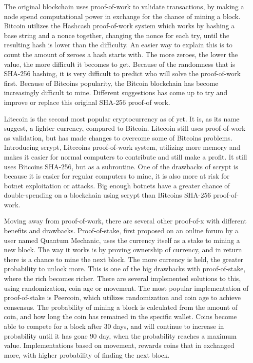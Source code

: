 \documentclass[11pt]{article}
\begin{document}
The original blockchain uses proof-of-work to validate transactions, by making a node spend computational power in exchange for the chance of mining a block. Bitcoin utilizes the Hashcash\cite{hashcash} proof-of-work system which works by hashing a base string and a nonce together, changing the nonce for each try, until the resulting hash is lower than the difficulty. An easier way to explain this is to count the amount of zeroes a hash starts with. The more zeroes, the lower the value, the more difficult it becomes to get. Because of the randomness that is SHA-256 hashing, it is very difficult to predict who will solve the proof-of-work first. Because of Bitcoins popularity, the Bitcoin blockchain has become increasingly difficult to mine. Different suggestions has come up to try and improve or replace this original SHA-256 proof-of work. 

Litecoin is the second most popular cryptocurrency as of yet. It is, as its name suggest, a lighter currency, compared to Bitcoin. Litecoin still uses proof-of-work as validation, but has made changes to overcome some of Bitcoins problems. Introducing scrypt, Litecoins proof-of-work system, utilizing more memory and makes it easier for normal computers to contribute and still make a profit. It still uses Bitcoins SHA-256, but as a subroutine. One of the drawbacks of scrypt is because it is easier for regular computers to mine, it is also more at risk for botnet exploitation or attacks. Big enough botnets have a greater chance of double-spending on a blockchain using scrypt than Bitcoins SHA-256 proof-of-work.

Moving away from proof-of-work, there are several other proof-of-x with different benefits and drawbacks. Proof-of-stake, first proposed on an online forum by a user named Quantum Mechanic, uses the currency itself as a stake to mining a new block. The way it works is by proving ownership of currency, and in return there is a chance to mine the next block. The more currency is held, the greater probability to unlock more. This is one of the big drawbacks with proof-of-stake, where the rich becomes richer. There are several implemented solutions to this, using randomization, coin age or movement. The most popular implementation of proof-of-stake is Peercoin, which utilizes randomization and coin age to achieve consensus. The probability of mining a block is calculated from the amount of coin, and how long the coin has remained in the specific wallet. Coins become able to compete for a block after 30 days, and will continue to increase in probability until it has gone 90 day, when the probability reaches a maximum value. Implementations based on movement, rewards coins that in exchanged more, with higher probability of finding the next block. 
\end{document}
